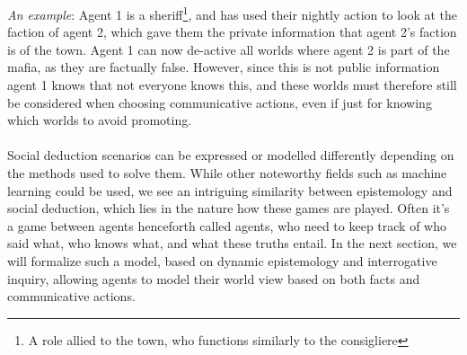 \textit{An example}: Agent 1 is a sheriff\footnote{A role allied to the town, who functions
	similarly to the consigliere}, and has used their nightly action to look at the
faction of agent 2, which gave them the private information that agent 2's
faction is of the town. Agent 1 can now de-active all worlds where agent 2 is
part of the mafia, as they are factually false. However, since this is not
public information agent 1 knows that not everyone knows this, and these
worlds must therefore still be considered when choosing communicative actions,
even if just for knowing which worlds to avoid promoting. \\\\ Social deduction
scenarios can be expressed or modelled differently depending on the methods
used to solve them. While other noteworthy fields such as machine learning
could be used, we see an intriguing similarity between epistemology and social
deduction, which lies in the nature how these games are played. Often it's a
game between agents henceforth called agents, who need to keep track of who
said what, who knows what, and what these truths entail. In the next section,
we will formalize such a model, based on dynamic epistemology and interrogative
inquiry, allowing agents to model their world view based on both facts and
communicative actions.